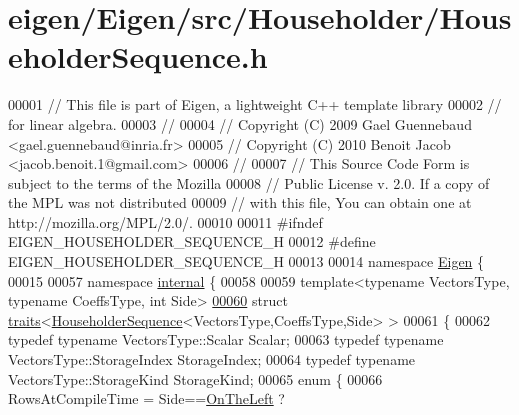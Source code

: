 \hypertarget{eigen_2_eigen_2src_2_householder_2_householder_sequence_8h_source}{}\section{eigen/\+Eigen/src/\+Householder/\+Householder\+Sequence.h}
\label{eigen_2_eigen_2src_2_householder_2_householder_sequence_8h_source}

\begin{DoxyCode}
00001 \textcolor{comment}{// This file is part of Eigen, a lightweight C++ template library}
00002 \textcolor{comment}{// for linear algebra.}
00003 \textcolor{comment}{//}
00004 \textcolor{comment}{// Copyright (C) 2009 Gael Guennebaud <gael.guennebaud@inria.fr>}
00005 \textcolor{comment}{// Copyright (C) 2010 Benoit Jacob <jacob.benoit.1@gmail.com>}
00006 \textcolor{comment}{//}
00007 \textcolor{comment}{// This Source Code Form is subject to the terms of the Mozilla}
00008 \textcolor{comment}{// Public License v. 2.0. If a copy of the MPL was not distributed}
00009 \textcolor{comment}{// with this file, You can obtain one at http://mozilla.org/MPL/2.0/.}
00010 
00011 \textcolor{preprocessor}{#ifndef EIGEN\_HOUSEHOLDER\_SEQUENCE\_H}
00012 \textcolor{preprocessor}{#define EIGEN\_HOUSEHOLDER\_SEQUENCE\_H}
00013 
00014 \textcolor{keyword}{namespace }\hyperlink{namespace_eigen}{Eigen} \{ 
00015 
00057 \textcolor{keyword}{namespace }\hyperlink{namespaceinternal}{internal} \{
00058 
00059 \textcolor{keyword}{template}<\textcolor{keyword}{typename} VectorsType, \textcolor{keyword}{typename} CoeffsType, \textcolor{keywordtype}{int} S\textcolor{keywordtype}{id}e>
\hyperlink{struct_eigen_1_1internal_1_1traits_3_01_householder_sequence_3_01_vectors_type_00_01_coeffs_type_00_01_side_01_4_01_4}{00060} \textcolor{keyword}{struct }\hyperlink{struct_eigen_1_1internal_1_1traits}{traits}<\hyperlink{group___householder___module_class_eigen_1_1_householder_sequence}{HouseholderSequence}<VectorsType,CoeffsType,Side> >
00061 \{
00062   \textcolor{keyword}{typedef} \textcolor{keyword}{typename} VectorsType::Scalar Scalar;
00063   \textcolor{keyword}{typedef} \textcolor{keyword}{typename} VectorsType::StorageIndex StorageIndex;
00064   \textcolor{keyword}{typedef} \textcolor{keyword}{typename} VectorsType::StorageKind StorageKind;
00065   \textcolor{keyword}{enum} \{
00066     RowsAtCompileTime = Side==\hyperlink{group__enums_ggac22de43beeac7a78b384f99bed5cee0ba129609b3bdf23b071f5f86cf2f995ec4}{OnTheLeft} ? 

\end{DoxyCode}
